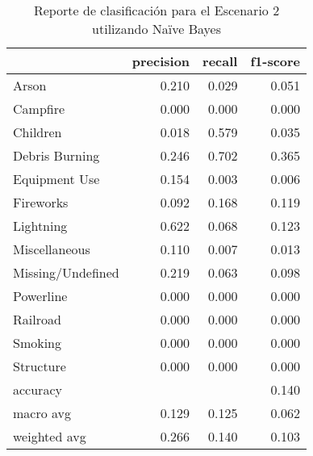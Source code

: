 \begin{table}
\centering
\caption{Reporte de clasificación para el Escenario 2 utilizando Naïve Bayes}
\label{tab:NB_Escenario 2}
\begin{tabular}{lrrr}
\toprule
{} &  precision &  recall &  f1-score \\
\midrule
Arson             &      0.210 &   0.029 &     0.051 \\
Campfire          &      0.000 &   0.000 &     0.000 \\
Children          &      0.018 &   0.579 &     0.035 \\
Debris Burning    &      0.246 &   0.702 &     0.365 \\
Equipment Use     &      0.154 &   0.003 &     0.006 \\
Fireworks         &      0.092 &   0.168 &     0.119 \\
Lightning         &      0.622 &   0.068 &     0.123 \\
Miscellaneous     &      0.110 &   0.007 &     0.013 \\
Missing/Undefined &      0.219 &   0.063 &     0.098 \\
Powerline         &      0.000 &   0.000 &     0.000 \\
Railroad          &      0.000 &   0.000 &     0.000 \\
Smoking           &      0.000 &   0.000 &     0.000 \\
Structure         &      0.000 &   0.000 &     0.000 \\
accuracy          &            &         &     0.140 \\
macro avg         &      0.129 &   0.125 &     0.062 \\
weighted avg      &      0.266 &   0.140 &     0.103 \\
\bottomrule
\end{tabular}
\end{table}
